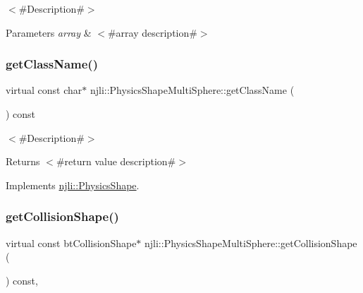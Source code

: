 $<$\#\+Description\#$>$


\begin{DoxyParams}{Parameters}
{\em array} & $<$\#array description\#$>$ \\
\hline
\end{DoxyParams}
\mbox{\label{classnjli_1_1_physics_shape_multi_sphere_a9a1d33140c781451ceccc749e0233033}} 
\subsubsection{\texorpdfstring{get\+Class\+Name()}{getClassName()}}
{\footnotesize\ttfamily virtual const char$\ast$ njli\+::\+Physics\+Shape\+Multi\+Sphere\+::get\+Class\+Name (\begin{DoxyParamCaption}{ }\end{DoxyParamCaption}) const\hspace{0.3cm}{\ttfamily [virtual]}}

$<$\#\+Description\#$>$

\begin{DoxyReturn}{Returns}
$<$\#return value description\#$>$ 
\end{DoxyReturn}


Implements \mbox{\hyperlink{classnjli_1_1_physics_shape_a72cb98a55614a3e264b8e4a157b45c64}{njli\+::\+Physics\+Shape}}.

\mbox{\label{classnjli_1_1_physics_shape_multi_sphere_a3e11137ac6e9e9ef6e76ee396db9297a}} 
\subsubsection{\texorpdfstring{get\+Collision\+Shape()}{getCollisionShape()}\hspace{0.1cm}{\footnotesize\ttfamily [1/2]}}
{\footnotesize\ttfamily virtual const bt\+Collision\+Shape$\ast$ njli\+::\+Physics\+Shape\+Multi\+Sphere\+::get\+Collision\+Shape (\begin{DoxyParamCaption}{ }\end{DoxyParamCaption}) const\hspace{0.3cm}{\ttfamily [protected]}, {\ttfamily [virtual]}}



